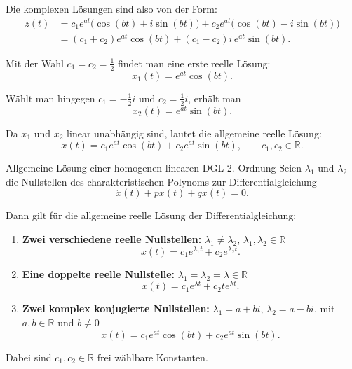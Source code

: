 \begin{enumerate}
          Die komplexen Lösungen sind also von der Form:
          \begin{align*}
              z(t)
               & =c_1e^{at}\bigl(\cos(bt)+i\sin(bt)\bigr)
              +c_2e^{at}\bigl(\cos(bt)-i\sin(bt)\bigr)    \\
               & =(c_1+c_2)e^{at}\cos(bt)
              +(c_1-c_2)i\,e^{at}\sin(bt).
          \end{align*}

          Mit der Wahl \(c_1=c_2=\frac12\) findet man eine erste reelle Lösung:
          \[
              x_1(t)=e^{at}\cos(bt).
          \]

          Wählt man hingegen \(c_1=-\frac12 i\) und
          \(c_2=\frac12 i\), erhält man
          \[
              x_2(t)=e^{at}\sin(bt).
          \]

          Da \(x_1\) und \(x_2\) linear unabhängig sind, lautet die
          allgemeine reelle Lösung:
          \[
              \boxed{x(t)=c_1e^{at}\cos(bt)+c_2e^{at}\sin(bt)},
              \qquad c_1,c_2\in\mathbb{R}.
          \]
\end{enumerate}

\begin{satz}{Allgemeine Lösung einer homogenen linearen DGL 2. Ordnung}{}
    Seien \(\lambda_1\) und \(\lambda_2\) die Nullstellen des
    charakteristischen Polynoms zur Differentialgleichung
    \[
        \ddot{x}(t)+p\dot{x}(t)+qx(t)=0.
    \]

    Dann gilt für die allgemeine reelle Lösung der Differentialgleichung:

    \begin{enumerate}
        \item \textbf{Zwei verschiedene reelle Nullstellen:}
              \(\lambda_1\neq\lambda_2\), \(\lambda_1,\lambda_2\in\mathbb{R}\)
              \[
                  x(t)=c_1e^{\lambda_1t}+c_2e^{\lambda_2t}.
              \]

        \item \textbf{Eine doppelte reelle Nullstelle:}
              \(\lambda_1=\lambda_2=\lambda\in\mathbb{R}\)
              \[
                  x(t)=c_1e^{\lambda t}+c_2t e^{\lambda t}.
              \]

        \item \textbf{Zwei komplex konjugierte Nullstellen:}
              \(\lambda_1=a+bi\), \(\lambda_2=a-bi\),
              mit \(a,b\in\mathbb{R}\) und \(b\neq 0\)
              \[
                  x(t)=c_1e^{at}\cos(bt)+c_2e^{at}\sin(bt).
              \]
    \end{enumerate}

    Dabei sind \(c_1,c_2\in\mathbb{R}\) frei wählbare Konstanten.
\end{satz}




